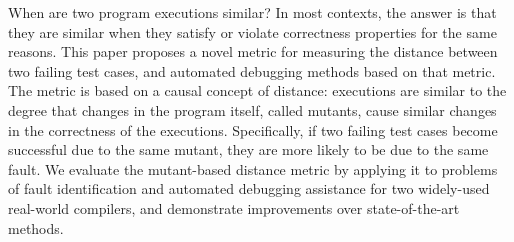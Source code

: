 When are two program executions similar?  In most contexts, the answer is that they are similar when they satisfy or violate correctness properties for the same reasons.  This paper proposes a novel metric for measuring the distance between two failing test cases, and automated debugging methods based on that metric.  The metric is based on a causal concept of distance:  executions are similar to the degree that changes in the program itself, called mutants, cause similar changes in the correctness of the executions.  Specifically, if two failing test cases become successful due to the same mutant, they are more likely to be due to the same fault.  We evaluate the mutant-based distance metric by applying it to problems of fault identification and automated debugging assistance for two widely-used real-world compilers, and demonstrate improvements over state-of-the-art methods.